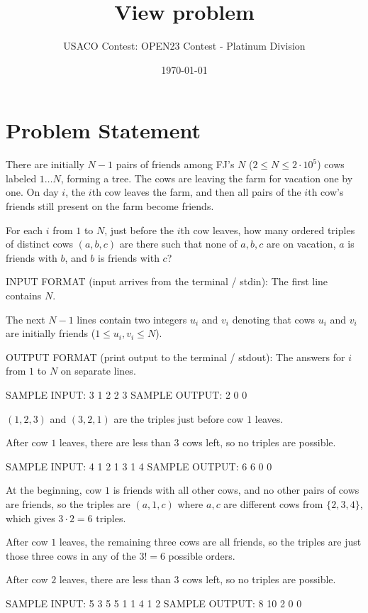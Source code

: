 \documentclass[12pt]{article}
\title{View problem}
\author{USACO Contest: OPEN23 Contest - Platinum Division}
\date{\today}
\begin{document}
\maketitle

\section*{Problem Statement}


There are initially $N-1$ pairs of friends among FJ's $N$
($2\le N\le 2\cdot 10^5$) cows labeled $1\dots N$, forming a tree. The cows are
leaving the farm for vacation one by one. On day $i$, the $i$th cow leaves the
farm, and then all pairs of the $i$th cow's friends still present on the farm
become friends. 

For each $i$ from $1$ to $N$, just before the $i$th cow leaves,  how many
ordered triples of distinct cows $(a,b,c)$ are there such that none of $a,b,c$
are on vacation, $a$ is friends with $b$, and $b$ is friends with $c$?

INPUT FORMAT (input arrives from the terminal / stdin):
The first line contains $N$.

The next $N-1$ lines contain two integers $u_i$ and $v_i$ denoting that cows
$u_i$ and $v_i$ are initially friends ($1\le u_i,v_i\le N$).

OUTPUT FORMAT (print output to the terminal / stdout):
The answers for $i$ from $1$ to $N$ on separate lines.

SAMPLE INPUT:
3
1 2
2 3
SAMPLE OUTPUT: 
2
0
0

$(1,2,3)$ and $(3,2,1)$ are the triples just before cow $1$ leaves.

After cow
$1$ leaves, there are less than $3$ cows left, so no triples are possible.

SAMPLE INPUT:
4
1 2
1 3
1 4
SAMPLE OUTPUT: 
6
6
0
0

At the beginning, cow $1$ is friends with all other cows, and no other pairs of
cows are friends, so the triples are $(a, 1, c)$ where $a, c$ are different cows
from $\{2, 3, 4\}$, which gives $3 \cdot 2 = 6$ triples.

After cow $1$ leaves, the remaining three cows are all friends, so the triples
are just those three cows in any of the $3! = 6$ possible orders.

After cow $2$ leaves, there are less than $3$ cows left, so no triples are
possible.

SAMPLE INPUT:
5
3 5
5 1
1 4
1 2
SAMPLE OUTPUT: 
8
10
2
0
0
\end{document}
